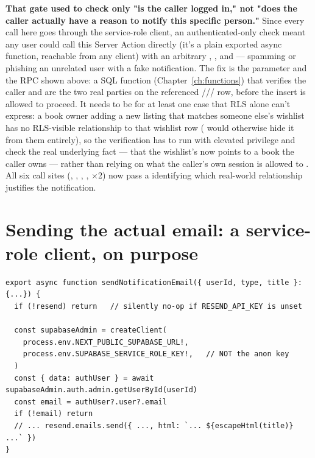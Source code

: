 \begin{olknote}
\textbf{That gate used to check only "is the caller logged in," not "does the caller actually have a reason to notify this specific person."} Since every call here goes through the service-role client, an authenticated-only check meant any user could call this Server Action directly (it's a plain exported async function, reachable from any client) with an arbitrary , , and  — spamming or phishing an unrelated user with a fake notification. The fix is the  parameter and the  RPC shown above: a  SQL function (Chapter~\ref{ch:functions}) that verifies the caller and  are the two real parties on the referenced /// row, before the insert is allowed to proceed. It needs to be  for at least one case that RLS alone can't express: a book owner adding a new listing that matches someone else's wishlist has no RLS-visible relationship to that wishlist row ( would otherwise hide it from them entirely), so the verification has to run with elevated privilege and check the real underlying fact — that the wishlist's  now points to a book the caller owns — rather than relying on what the caller's own session is allowed to . All six call sites (, , , ,  $\times$2) now pass a  identifying which real-world relationship justifies the notification.
\end{olknote}

\section{Sending the actual email: a service-role client, on purpose}

\begin{lstlisting}[caption={src/lib/send-notification-email.ts — the privileged lookup}]
export async function sendNotificationEmail({ userId, type, title }: {...}) {
  if (!resend) return   // silently no-op if RESEND_API_KEY is unset

  const supabaseAdmin = createClient(
    process.env.NEXT_PUBLIC_SUPABASE_URL!,
    process.env.SUPABASE_SERVICE_ROLE_KEY!,   // NOT the anon key
  )
  const { data: authUser } = await supabaseAdmin.auth.admin.getUserById(userId)
  const email = authUser?.user?.email
  if (!email) return
  // ... resend.emails.send({ ..., html: `... ${escapeHtml(title)} ...` })
}
\end{lstlisting}


